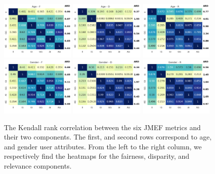 \begin{figure}[ht]
    \centering
    \includegraphics[width=0.32\textwidth]{Figures/Figure_4_Age_0.png}
    \includegraphics[width=0.32\textwidth]{Figures/Figure_4_Age_1.png} \includegraphics[width=0.32\textwidth]{Figures/Figure_4_Age_2.png}
    \\
    \includegraphics[width=0.32\textwidth]{Figures/Figure_4_Gender_0.png}  \includegraphics[width=0.32\textwidth]{Figures/Figure_4_Gender_1.png}  \includegraphics[width=0.32\textwidth]{Figures/Figure_4_Gender_2.png} 
    \caption{The Kendall rank correlation between the six JMEF metrics and their two components. The first, and second rows correspond to age, and gender user attributes. From the left to the right column, we respectively find the heatmaps for the fairness, disparity, and relevance components.}
    \label{kendall}
\end{figure}

